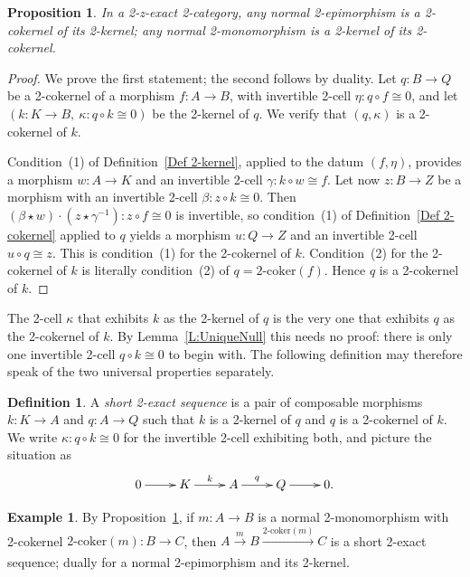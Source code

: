 \documentclass[reqno,a4paper]{amsart}
\numberwithin{equation}{section}
\theoremstyle{plain}
\newtheorem{proposition}[subsection]{Proposition}
\theoremstyle{definition}
\newtheorem{definition}[subsection]{Definition}
\newtheorem{example}[subsection]{Example}
\def\nameit#1{\textrm{#1}~}
\def\prox{\nameit{Proposition}}
\def\lemx{\nameit{Lemma}}
\def\defx{\nameit{Definition}}
\def\dfn#1{{\itshape #1}}
\newcommand{\comp}{\circ}
\newcommand{\iso}{\cong}
\renewcommand{\1}{\onecat{1}}
\newcommand{\twocoker}{\ensuremath{2\text{-}\mathrm{coker}}}
\newcommand{\aar}[2][]{\xrightarrow[#1]{#2}}
\begin{document}
\begin{proposition}\label{kernel is kernel of its cokernel}
	In a 2-z-exact 2-category, any normal 2-epimorphism is a 2-cokernel of its 2-kernel; any normal 2-monomorphism is a 2-kernel of its 2-cokernel.
\end{proposition}
\begin{proof}
	We prove the first statement; the second follows by duality. Let \(q\colon B\to Q\) be a 2-cokernel of a morphism \(f\colon A\to B\), with invertible 2-cell \(\eta\colon q\comp f\iso 0\), and let \((k\colon K\to B,\ \kappa\colon q\comp k\iso 0)\) be the 2-kernel of \(q\). We verify that \((q,\kappa)\) is a 2-cokernel of \(k\).

	Condition~(1) of \defx\ref{Def 2-kernel}, applied to the datum \((f,\eta)\), provides a morphism \(w\colon A\to K\) and an invertible 2-cell \(\gamma\colon k\comp w\iso f\). Let now \(z\colon B\to Z\) be a morphism with an invertible 2-cell \(\beta\colon z\comp k\iso 0\). Then \((\beta\star w)\cdot(z\star\gamma^{-1})\colon z\comp f\iso 0\) is invertible, so condition~(1) of \defx\ref{Def 2-cokernel} applied to \(q\) yields a morphism \(u\colon Q\to Z\) and an invertible 2-cell \(u\comp q\iso z\). This is condition~(1) for the 2-cokernel of \(k\). Condition~(2) for the 2-cokernel of \(k\) is literally condition~(2) of \(q=\twocoker(f)\). Hence \(q\) is a 2-cokernel of \(k\).
\end{proof}

The 2-cell \(\kappa\) that exhibits \(k\) as the 2-kernel of \(q\) is the very one that exhibits \(q\) as the 2-cokernel of \(k\). By \lemx\ref{L:UniqueNull} this needs no proof: there is only one invertible 2-cell \(q\comp k\iso 0\) to begin with. The following definition may therefore speak of the two universal properties separately.

\begin{definition}\label{Def:SES}
	A \dfn{short 2-exact sequence} is a pair of composable morphisms \(k\colon K\to A\) and \(q\colon A\to Q\) such that \(k\) is a 2-kernel of \(q\) and \(q\) is a 2-cokernel of \(k\). We write \(\kappa\colon q\comp k\iso 0\) for the invertible 2-cell exhibiting both, and picture the situation as
	\begin{equation}\label{SES}
		\xymatrix{0 \ar[r] & K \ar[r]^-{k} & A \ar[r]^-{q} & Q \ar[r] & 0\text{.}}
	\end{equation}
\end{definition}

\begin{example}\label{Ex SES}
	By \prox\ref{kernel is kernel of its cokernel}, if \(m\colon A\to B\) is a normal 2-monomorphism with 2-cokernel \(\twocoker(m)\colon B\to C\), then \(A\aar{m}B\aar{\twocoker(m)}C\) is a short 2-exact sequence; dually for a normal 2-epimorphism and its 2-kernel.
\end{example}
\end{document}
